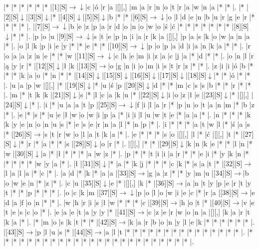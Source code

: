 \documentclass[11pt]{article}
\newcommand\drarr{$\rightarrow \!\!\!\!\! \downarrow$}
\newcommand\rarr{$\rightarrow$}
\newcommand\darr{$\downarrow$}
\begin{document}
\noindent\begin{Puzzle}{24}{25}|*	|*	|*	|*	|*	|*	|[1][S]\drarr	|c	|ó	|r	|a	|[][,]{ }	|m	|a	|r	|n	|o	|t	|r	|a	|w	|n	|a	|*	|*	|.
|*	|[2][S]\darr	|[3][S]\darr	|*	|[4][S]\darr	|[5][S]\darr	|b	|*	|*	|[6][S]\drarr	|o	|l	|d	|e	|n	|b	|u	|r	|g	|e	|r	|*	|*	|*	|*	|.
|[7][S]\drarr	|b	|e	|z	|p	|a	|r	|d	|o	|n	|o	|w	|o	|ś	|ć	|*	|*	|*	|*	|*	|*	|*	|[8][S]\darr	|*	|*	|.
|p	|o	|u	|[9][S]\drarr	|s	|t	|e	|p	|n	|i	|a	|r	|k	|a	|[][,]{ }	|p	|a	|s	|k	|o	|w	|a	|n	|a	|*	|.
|o	|l	|k	|p	|i	|e	|y	|*	|*	|e	|*	|*	|[10][S]\drarr	|p	|o	|p	|a	|d	|i	|a	|n	|k	|a	|*	|*	|.
|r	|o	|a	|a	|z	|n	|e	|*	|*	|w	|[11][S]\drarr	|c	|h	|e	|m	|i	|z	|a	|c	|j	|a	|*	|d	|*	|*	|.
|o	|n	|l	|r	|ą	|y	|r	|*	|[12][S]\darr	|ł	|k	|[13][S]\rarr	|o	|g	|n	|i	|o	|m	|i	|s	|t	|r	|z	|*	|*	|.
|z	|i	|i	|ó	|b	|*	|*	|*	|k	|a	|o	|*	|n	|*	|*	|[14][S]\darr	|[15][S]\darr	|[16][S]\darr	|[17][S]\darr	|[18][S]\darr	|*	|*	|ó	|*	|*	|.
|u	|a	|p	|w	|[][,]{ }	|*	|[19][S]\darr	|*	|u	|ś	|p	|[20][S]\darr	|d	|*	|*	|m	|c	|s	|s	|b	|*	|*	|r	|*	|*	|.
|m	|*	|t	|k	|k	|[21][S]\darr	|s	|*	|l	|c	|a	|k	|u	|*	|[22][S]\darr	|i	|o	|z	|ł	|e	|[23][S]\darr	|*	|[][,]{ }	|[24][S]\darr	|*	|.
|i	|*	|u	|a	|a	|t	|p	|[25][S]\drarr	|f	|i	|l	|a	|r	|*	|p	|n	|o	|t	|a	|n	|m	|*	|b	|z	|*	|.
|e	|*	|s	|*	|u	|e	|ł	|w	|o	|w	|i	|p	|a	|*	|i	|i	|l	|u	|w	|t	|e	|*	|a	|a	|*	|.
|n	|*	|*	|*	|k	|k	|y	|e	|n	|o	|n	|u	|s	|*	|e	|s	|e	|r	|n	|a	|l	|*	|n	|p	|*	|.
|i	|*	|*	|*	|a	|t	|w	|l	|*	|ś	|a	|s	|*	|[26][S]\rarr	|s	|t	|r	|w	|o	|l	|a	|t	|k	|a	|*	|.
|e	|*	|*	|*	|s	|o	|[][,]{ }	|l	|*	|ć	|[][,]{ }	|t	|*	|[27][S]\darr	|*	|r	|*	|a	|*	|*	|s	|[28][S]\darr	|o	|r	|*	|.
|[][,]{ }	|*	|*	|[29][S]\darr	|k	|n	|k	|e	|*	|*	|l	|n	|*	|w	|[30][S]\darr	|a	|*	|ł	|*	|*	|*	|a	|w	|z	|*	|.
|p	|*	|*	|t	|i	|i	|a	|r	|*	|*	|e	|i	|*	|y	|k	|n	|*	|*	|*	|*	|*	|w	|y	|a	|*	|.
|ł	|[31][S]\darr	|*	|a	|*	|k	|j	|*	|*	|*	|c	|k	|*	|s	|a	|t	|*	|[32][S]\rarr	|l	|a	|l	|a	|*	|c	|*	|.
|a	|d	|*	|k	|*	|a	|a	|[33][S]\rarr	|g	|a	|z	|*	|*	|y	|m	|u	|[34][S]\rarr	|b	|o	|w	|e	|n	|*	|z	|*	|.
|c	|u	|[35][S]\darr	|e	|*	|[][,]{ }	|k	|*	|[36][S]\rarr	|a	|n	|t	|y	|p	|e	|r	|t	|y	|t	|*	|*	|p	|*	|*	|*	|.
|o	|c	|k	|m	|[37][S]\drarr	|p	|o	|l	|o	|w	|i	|e	|c	|*	|r	|a	|[38][S]\rarr	|e	|d	|a	|f	|o	|n	|*	|*	|.
|w	|h	|r	|i	|s	|ł	|w	|*	|*	|*	|c	|[39][S]\rarr	|h	|o	|t	|*	|[40][S]\rarr	|v	|e	|t	|e	|s	|c	|o	|*	|.
|e	|a	|e	|t	|a	|y	|y	|*	|[41][S]\rarr	|c	|z	|e	|r	|w	|o	|n	|a	|[][,]{ }	|k	|a	|r	|t	|k	|a	|*	|.
|*	|m	|o	|s	|k	|t	|*	|*	|[42][S]\rarr	|k	|a	|r	|b	|o	|n	|y	|l	|e	|k	|*	|*	|*	|*	|*	|*	|.
|[43][S]\rarr	|p	|l	|u	|s	|*	|[44][S]\rarr	|a	|l	|t	|*	|*	|*	|*	|*	|*	|*	|*	|*	|*	|*	|*	|*	|*	|*	|.
|*	|*	|*	|*	|*	|*	|*	|*	|*	|*	|*	|*	|*	|*	|*	|*	|*	|*	|*	|*	|*	|*	|*	|*	|*	|.\end{Puzzle}
\end{document}
